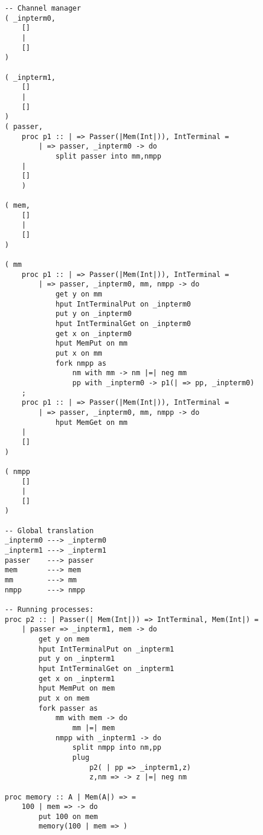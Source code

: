 \documentclass{article}
\theoremstyle{plain}%
\theoremstyle{definition}
\theoremstyle{remark}
\begin{document}
\begin{verbatim}
-- Channel manager
( _inpterm0,  
    []
    |
    []
)

( _inpterm1,  
    []
    |
    []
)
( passer,
    proc p1 :: | => Passer(|Mem(Int|)), IntTerminal = 
        | => passer, _inpterm0 -> do
            split passer into mm,nmpp 
    |
    []
    )

( mem,
    []
    |
    []
)

( mm
    proc p1 :: | => Passer(|Mem(Int|)), IntTerminal = 
        | => passer, _inpterm0, mm, nmpp -> do
            get y on mm
            hput IntTerminalPut on _inpterm0
            put y on _inpterm0
            hput IntTerminalGet on _inpterm0
            get x on _inpterm0
            hput MemPut on mm
            put x on mm
            fork nmpp as
                nm with mm -> nm |=| neg mm
                pp with _inpterm0 -> p1(| => pp, _inpterm0)
    ;
    proc p1 :: | => Passer(|Mem(Int|)), IntTerminal = 
        | => passer, _inpterm0, mm, nmpp -> do
            hput MemGet on mm 
    |
    []
)

( nmpp
    []
    |
    []
)

-- Global translation
_inpterm0 ---> _inpterm0 
_inpterm1 ---> _inpterm1 
passer    ---> passer 
mem       ---> mem
mm        ---> mm
nmpp      ---> nmpp

-- Running processes:
proc p2 :: | Passer(| Mem(Int|)) => IntTerminal, Mem(Int|) =
    | passer => _inpterm1, mem -> do
        get y on mem
        hput IntTerminalPut on _inpterm1
        put y on _inpterm1
        hput IntTerminalGet on _inpterm1
        get x on _inpterm1
        hput MemPut on mem
        put x on mem
        fork passer as
            mm with mem -> do
                mm |=| mem
            nmpp with _inpterm1 -> do
                split nmpp into nm,pp
                plug
                    p2( | pp => _inpterm1,z)
                    z,nm => -> z |=| neg nm

proc memory :: A | Mem(A|) => =
    100 | mem => -> do
        put 100 on mem
        memory(100 | mem => )
\end{verbatim}
\end{document}
